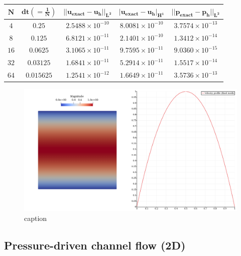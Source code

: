 \documentclass[a4paper,11pt,openright,twoside]{book}
\begin{document}
\begin{center}
\begin{tabular}{| c | c | c | c | c |}
\hline
$\mathbf{N}$ & $\mathbf{dt (= \frac{1}{N})}$ & $\mathbf{|| u_{exact} - u_h ||_{L^2}}$ & $ \mathbf{ | u_{exact} - u_h |_{H^1}}$ & $  \mathbf{ || p_{exact} - p_h ||_{L^2}}$ \\
\hline
$ 4 $ & $ 0.25 $ & $2.5488 \times 10^{-10}$ & $8.0081 \times 10^{-10}$ &  $ 3.7574 \times 10^{-13}$ \\
\hline
$ 8$ & $ 0.125 $ & $6.8121  \times 10^{-11}$ & $2.1401 \times 10^{-10}$ &  $ 1.3412  \times 10^{-14}$ \\
\hline
$ 16 $ & $ 0.0625 $ & $ 3.1065 \times 10^{-11}$ & $9.7595 \times 10^{-11}$ & $ 9.0360 \times 10^{-15}$ \\
\hline
$ 32$ & $ 0.03125 $ & $1.6841 \times 10^{-11}$ & $5.2914 \times 10^{-11}$ &  $ 1.5517 \times 10^{-14}$ \\
\hline
$ 64$ & $ 0.015625 $ & $1.2541 \times 10^{-12}$ & $1.6649 \times 10^{-11}$ &  $ 3.5736 \times 10^{-13}$ \\
\hline
\end{tabular}
\end{center}

\begin{figure}[ht]
\centering
\includegraphics[width=\textwidth]{images/velocity_fixed.png}
\caption{caption}
\end{figure}

\subsection{Pressure-driven channel flow (2D)}
\end{document}
